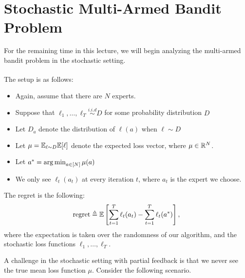\documentclass[11pt]{article}
\begin{document}
\section{Stochastic Multi-Armed Bandit Problem}

For the remaining time in this lecture, we will begin analyzing the multi-armed bandit problem in the stochastic setting.
\paragraph{}
The setup is as follows:
\begin{itemize}
    \item Again, assume that there are $N$ experts. 
    \item Suppose that $\ell_1,\dots, \ell_T \overset{i.i.d}{\sim} D$ for some probability distribution $D$
    \item Let $D_a$ denote the distribution of $\ell(a)$ when $\ell \sim D$
    \item Let $\mu = \mathbb{E}_{\ell \sim D} \mathbb{E}[\ell]$ denote the expected loss vector, where $\mu \in \mathbb{R}^N$.
    \item Let $a^* = \operatorname*{arg\,min}_{a \in [N]} \mu(a)$
    \item We only see $\ell_t(a_t)$ at every iteration $t$, where $a_t$ is the expert we choose. 
\end{itemize}
The regret is the following:
\begin{align*}
    \text{regret} \triangleq \mathbb{E} \left[ \sum_{t=1}^T \ell_t(a_t) - \sum_{t=1}^T \ell_t(a^*) \right],
\end{align*}
where the expectation is taken over the randomness of our algorithm, and the stochastic loss functions $\ell_1,\dots,\ell_T$. 

A challenge in the stochastic setting with partial feedback is that we never see the true mean loss function $\mu$. Consider the following scenario.
\paragraph{}
\end{document}
